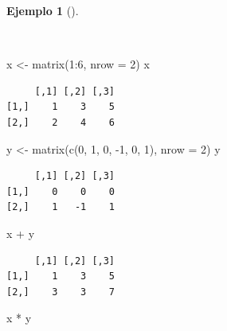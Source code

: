 \documentclass[
  a4paper,
]{scrreport}
\newenvironment{Shaded}{\begin{snugshade}}{\end{snugshade}}
\newcommand{\AttributeTok}[1]{\textcolor[rgb]{0.40,0.45,0.13}{#1}}
\newcommand{\DecValTok}[1]{\textcolor[rgb]{0.68,0.00,0.00}{#1}}
\newcommand{\FunctionTok}[1]{\textcolor[rgb]{0.28,0.35,0.67}{#1}}
\newcommand{\NormalTok}[1]{\textcolor[rgb]{0.00,0.23,0.31}{#1}}
\newcommand{\OtherTok}[1]{\textcolor[rgb]{0.00,0.23,0.31}{#1}}
\newcommand{\SpecialCharTok}[1]{\textcolor[rgb]{0.37,0.37,0.37}{#1}}
\theoremstyle{definition}
\theoremstyle{definition}
\newtheorem{example}{Ejemplo}[chapter]
\theoremstyle{remark}
\begin{document}
\begin{example}[]\protect\hypertarget{exm-operaciones-aritmeticas-matrices}{}\label{exm-operaciones-aritmeticas-matrices}

~

\begin{Shaded}
\begin{Highlighting}[]
\NormalTok{x }\OtherTok{\textless{}{-}} \FunctionTok{matrix}\NormalTok{(}\DecValTok{1}\SpecialCharTok{:}\DecValTok{6}\NormalTok{, }\AttributeTok{nrow =} \DecValTok{2}\NormalTok{)}
\NormalTok{x}
\end{Highlighting}
\end{Shaded}

\begin{verbatim}
     [,1] [,2] [,3]
[1,]    1    3    5
[2,]    2    4    6
\end{verbatim}

\begin{Shaded}
\begin{Highlighting}[]
\NormalTok{y }\OtherTok{\textless{}{-}} \FunctionTok{matrix}\NormalTok{(}\FunctionTok{c}\NormalTok{(}\DecValTok{0}\NormalTok{, }\DecValTok{1}\NormalTok{, }\DecValTok{0}\NormalTok{, }\SpecialCharTok{{-}}\DecValTok{1}\NormalTok{, }\DecValTok{0}\NormalTok{, }\DecValTok{1}\NormalTok{), }\AttributeTok{nrow =} \DecValTok{2}\NormalTok{)}
\NormalTok{y}
\end{Highlighting}
\end{Shaded}

\begin{verbatim}
     [,1] [,2] [,3]
[1,]    0    0    0
[2,]    1   -1    1
\end{verbatim}

\begin{Shaded}
\begin{Highlighting}[]
\NormalTok{x }\SpecialCharTok{+}\NormalTok{ y}
\end{Highlighting}
\end{Shaded}

\begin{verbatim}
     [,1] [,2] [,3]
[1,]    1    3    5
[2,]    3    3    7
\end{verbatim}

\begin{Shaded}
\begin{Highlighting}[]
\NormalTok{x }\SpecialCharTok{*}\NormalTok{ y}
\end{Highlighting}
\end{Shaded}


\end{example}
\end{document}
